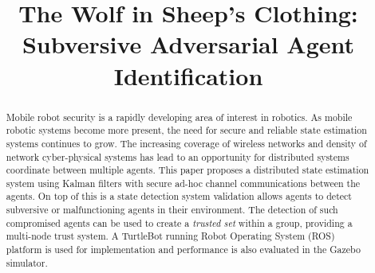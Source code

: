 \documentclass[conference]{IEEEtran}
\begin{document}
%
\title{The Wolf in Sheep's Clothing:\\
Subversive Adversarial Agent Identification}


\author{
}



\maketitle

\begin{abstract}

Mobile robot security is a rapidly developing area of interest in robotics. As mobile robotic systems become more present, the need for secure and reliable state estimation systems continues to grow. The increasing coverage of wireless networks and density of network cyber-physical systems has lead to an opportunity for distributed systems coordinate between multiple agents. This paper proposes a distributed state estimation system using Kalman filters with secure ad-hoc channel communications between the agents. On top of this is a state detection system validation allows agents to detect subversive or malfunctioning agents in their environment. The detection of such compromised agents can be used to create a \textit{trusted set} within a group, providing a multi-node trust system. A TurtleBot running Robot Operating System (ROS) platform is used for implementation and performance is also evaluated in the Gazebo simulator.

\end{abstract}
\end{document}
